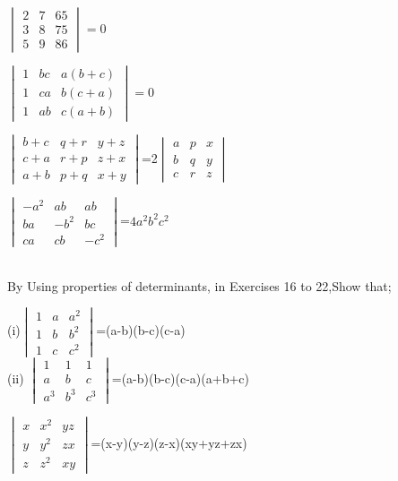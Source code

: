 \\
\solution 

\item $\begin{vmatrix}2&7&65\\3&8&75\\5&9&86\end{vmatrix}=0$
\\
\solution 

\item $\begin{vmatrix}1&bc&a(b+c)\\1&ca&b(c+a)\\1&ab&c(a+b)\end{vmatrix}=0$
\\
\solution 

\item $\begin{vmatrix}b+c& q+r& y+z\\c+a& r+p& z+x\\a+b& p+q& x+y\end{vmatrix}$=2$\begin{vmatrix} a&p&x\\b&q&y\\c&r&z\end{vmatrix}$ 
\\
\solution 

\item $\begin{vmatrix}-a^2&ab&ab\\ ba&-b^2&bc\\ ca&cb&-c^2\end{vmatrix}$=$4a^2b^2c^2$\\
\\
\solution 

By Using properties of determinants, in Exercises 16 to 22,Show that;
\item (i)$\begin{vmatrix}1&a&a^2\\1&b&b^2\\1&c&c^2\end{vmatrix}$=(a-b)(b-c)(c-a)\\
(ii) $\begin{vmatrix}1&1&1 \\ a&b&c \\ a^3&b^3&c^3\end{vmatrix}$=(a-b)(b-c)(c-a)(a+b+c)
\\
\solution 

\item $\begin{vmatrix}x&x^2&yz \\ y&y^2&zx \\ z&z^2&xy\end{vmatrix}$=(x-y)(y-z)(z-x)(xy+yz+zx)

